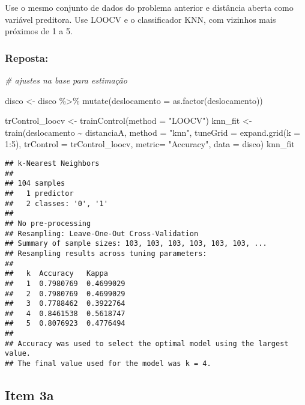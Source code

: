 \documentclass[
]{article}
\newenvironment{Shaded}{\begin{snugshade}}{\end{snugshade}}
\newcommand{\AttributeTok}[1]{\textcolor[rgb]{0.77,0.63,0.00}{#1}}
\newcommand{\CommentTok}[1]{\textcolor[rgb]{0.56,0.35,0.01}{\textit{#1}}}
\newcommand{\DecValTok}[1]{\textcolor[rgb]{0.00,0.00,0.81}{#1}}
\newcommand{\FunctionTok}[1]{\textcolor[rgb]{0.00,0.00,0.00}{#1}}
\newcommand{\NormalTok}[1]{#1}
\newcommand{\OtherTok}[1]{\textcolor[rgb]{0.56,0.35,0.01}{#1}}
\newcommand{\SpecialCharTok}[1]{\textcolor[rgb]{0.00,0.00,0.00}{#1}}
\newcommand{\StringTok}[1]{\textcolor[rgb]{0.31,0.60,0.02}{#1}}
\begin{document}
Use o mesmo conjunto de dados do problema anterior e distância aberta
como variável preditora. Use LOOCV e o classificador KNN, com vizinhos
mais próximos de 1 a 5.

\hypertarget{reposta}{%
\subsubsection{Reposta:}\label{reposta}}

\begin{Shaded}
\begin{Highlighting}[]
\CommentTok{\# ajustes na base para estimação}

\NormalTok{disco }\OtherTok{\textless{}{-}}\NormalTok{ disco }\SpecialCharTok{\%\textgreater{}\%} 
  \FunctionTok{mutate}\NormalTok{(}\AttributeTok{deslocamento =} \FunctionTok{as.factor}\NormalTok{(deslocamento))}

\NormalTok{trControl\_loocv }\OtherTok{\textless{}{-}} \FunctionTok{trainControl}\NormalTok{(}\AttributeTok{method =} \StringTok{"LOOCV"}\NormalTok{)}
\NormalTok{knn\_fit }\OtherTok{\textless{}{-}} \FunctionTok{train}\NormalTok{(deslocamento }\SpecialCharTok{\textasciitilde{}}\NormalTok{ distanciaA, }\AttributeTok{method =} \StringTok{"knn"}\NormalTok{,}
\AttributeTok{tuneGrid =} \FunctionTok{expand.grid}\NormalTok{(}\AttributeTok{k =} \DecValTok{1}\SpecialCharTok{:}\DecValTok{5}\NormalTok{),}
\AttributeTok{trControl =}\NormalTok{ trControl\_loocv, }\AttributeTok{metric=} \StringTok{"Accuracy"}\NormalTok{,}
\AttributeTok{data =}\NormalTok{ disco)}
\NormalTok{knn\_fit}
\end{Highlighting}
\end{Shaded}

\begin{verbatim}
## k-Nearest Neighbors 
## 
## 104 samples
##   1 predictor
##   2 classes: '0', '1' 
## 
## No pre-processing
## Resampling: Leave-One-Out Cross-Validation 
## Summary of sample sizes: 103, 103, 103, 103, 103, 103, ... 
## Resampling results across tuning parameters:
## 
##   k  Accuracy   Kappa    
##   1  0.7980769  0.4699029
##   2  0.7980769  0.4699029
##   3  0.7788462  0.3922764
##   4  0.8461538  0.5618747
##   5  0.8076923  0.4776494
## 
## Accuracy was used to select the optimal model using the largest value.
## The final value used for the model was k = 4.
\end{verbatim}

\hypertarget{item-3a}{%
\subsection{Item 3a}\label{item-3a}}
\end{document}
